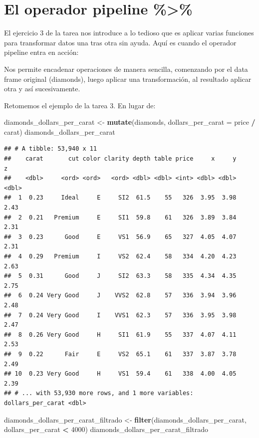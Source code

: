 \documentclass[]{book}
\newenvironment{Shaded}{\begin{snugshade}}{\end{snugshade}}
\newcommand{\KeywordTok}[1]{\textcolor[rgb]{0.13,0.29,0.53}{\textbf{#1}}}
\newcommand{\DataTypeTok}[1]{\textcolor[rgb]{0.13,0.29,0.53}{#1}}
\newcommand{\DecValTok}[1]{\textcolor[rgb]{0.00,0.00,0.81}{#1}}
\newcommand{\StringTok}[1]{\textcolor[rgb]{0.31,0.60,0.02}{#1}}
\newcommand{\OperatorTok}[1]{\textcolor[rgb]{0.81,0.36,0.00}{\textbf{#1}}}
\newcommand{\NormalTok}[1]{#1}
\theoremstyle{definition}
\theoremstyle{definition}
\theoremstyle{definition}
\theoremstyle{remark}
\begin{document}
\section{El operador pipeline
\%\textgreater{}\%}\label{el-operador-pipeline}

El ejercicio 3 de la tarea nos introduce a lo tedioso que es aplicar
varias funciones para transformar datos una tras otra sin ayuda. Aquí es
cuando el operador pipeline entra en acción:

Nos permite encadenar operaciones de manera sencilla, comenzando por el
data frame original (diamonds), luego aplicar una transformación, al
resultado aplicar otra y así sucesivamente.

Retomemos el ejemplo de la tarea 3. En lugar de:

\begin{Shaded}
\begin{Highlighting}[]
\NormalTok{diamonds_dollars_per_carat <-}\StringTok{ }\KeywordTok{mutate}\NormalTok{(diamonds, }\DataTypeTok{dollars_per_carat =}\NormalTok{ price }\OperatorTok{/}\StringTok{ }\NormalTok{carat)}
\NormalTok{diamonds_dollars_per_carat}
\end{Highlighting}
\end{Shaded}

\begin{verbatim}
## # A tibble: 53,940 x 11
##    carat       cut color clarity depth table price     x     y     z
##    <dbl>     <ord> <ord>   <ord> <dbl> <dbl> <int> <dbl> <dbl> <dbl>
##  1  0.23     Ideal     E     SI2  61.5    55   326  3.95  3.98  2.43
##  2  0.21   Premium     E     SI1  59.8    61   326  3.89  3.84  2.31
##  3  0.23      Good     E     VS1  56.9    65   327  4.05  4.07  2.31
##  4  0.29   Premium     I     VS2  62.4    58   334  4.20  4.23  2.63
##  5  0.31      Good     J     SI2  63.3    58   335  4.34  4.35  2.75
##  6  0.24 Very Good     J    VVS2  62.8    57   336  3.94  3.96  2.48
##  7  0.24 Very Good     I    VVS1  62.3    57   336  3.95  3.98  2.47
##  8  0.26 Very Good     H     SI1  61.9    55   337  4.07  4.11  2.53
##  9  0.22      Fair     E     VS2  65.1    61   337  3.87  3.78  2.49
## 10  0.23 Very Good     H     VS1  59.4    61   338  4.00  4.05  2.39
## # ... with 53,930 more rows, and 1 more variables: dollars_per_carat <dbl>
\end{verbatim}

\begin{Shaded}
\begin{Highlighting}[]
\NormalTok{diamonds_dollars_per_carat_filtrado <-}\StringTok{ }\KeywordTok{filter}\NormalTok{(diamonds_dollars_per_carat, dollars_per_carat }\OperatorTok{<}\StringTok{ }\DecValTok{4000}\NormalTok{)}
\NormalTok{diamonds_dollars_per_carat_filtrado}
\end{Highlighting}
\end{Shaded}
\end{document}

